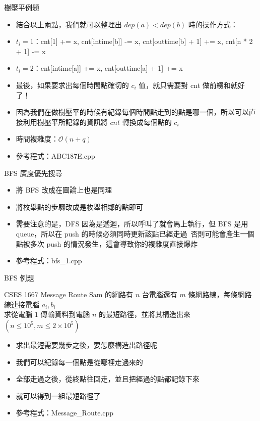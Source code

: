 \documentclass[aspectratio=169]{beamer}
\begin{document}
    \begin{frame}{樹壓平例題}
        \begin{itemize}
            \item<1-> 結合以上兩點，我們就可以整理出 $dep(a) < dep(b)$ 時的操作方式：
            \item<2-> $t_i = 1$：cnt[1] += x, cnt[intime[b]] -= x, cnt[outtime[b] + 1] += x, cnt[n * 2 + 1] -= x
            \item<2-> $t_i = 2$：cnt[intime[a]] += x, cnt[outtime[a] + 1] += x
            \item<3-> 最後，如果要求出每個時間點確切的 $c_i$ 值，就只需要對 cnt 做前綴和就好了！
            \item<4-> 因為我們在做樹壓平的時候有紀錄每個時間點走到的點是哪一個，所以可以直接利用樹壓平所記錄的資訊將 $cnt$ 轉換成每個點的 $c_i$
            \item<4-> 時間複雜度：$\mathcal{O}(n + q)$
            \item<4-> 參考程式：ABC187E.cpp
        \end{itemize}
    \end{frame}



    \begin{frame}{BFS 廣度優先搜尋}
        \begin{itemize}
            \item 將 BFS 改成在圖論上也是同理
            \item 將枚舉點的步驟改成是枚舉相鄰的點即可
            \item 需要注意的是，DFS 因為是遞迴，所以呼叫了就會馬上執行，但 BFS 是用 queue，所以在 push 的時候必須同時更新該點已經走過\
            否則可能會產生一個點被多次 push 的情況發生，這會導致你的複雜度直接爆炸
            \item 參考程式：bfs\_1.cpp
        \end{itemize}
    \end{frame}

    \begin{frame}{BFS 例題}
        \begin{block}{CSES 1667 Message Route}
            Sam 的網路有 $n$ 台電腦還有 $m$ 條網路線，每條網路線連接電腦 $a_i, b_i$\\
            求從電腦 $1$ 傳輸資料到電腦 $n$ 的最短路徑，並將其構造出來 $(n \le 10^5, m \le 2 \times 10^5)$
        \end{block}

        \begin{itemize}
            \item<1-> 求出最短需要幾步之後，要怎麼構造出路徑呢
            \item<2-> 我們可以紀錄每一個點是從哪裡走過來的
            \item<3-> 全部走過之後，從終點往回走，並且把經過的點都記錄下來
            \item<3-> 就可以得到一組最短路徑了
            \item<3-> 參考程式：Message\_Route.cpp
        \end{itemize}
    \end{frame}
\end{document}
